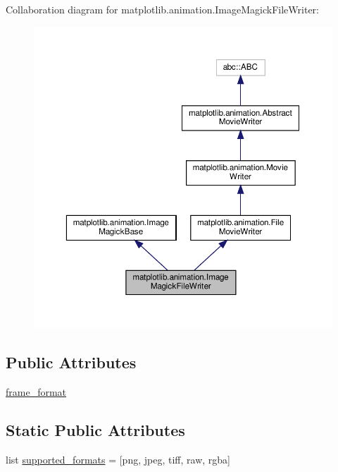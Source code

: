 Collaboration diagram for matplotlib.\+animation.\+Image\+Magick\+File\+Writer\+:
\nopagebreak
\begin{figure}[H]
\begin{center}
\leavevmode
\includegraphics[width=350pt]{classmatplotlib_1_1animation_1_1ImageMagickFileWriter__coll__graph}
\end{center}
\end{figure}
\subsection*{Public Attributes}
\begin{DoxyCompactItemize}
\item 
\hyperlink{classmatplotlib_1_1animation_1_1ImageMagickFileWriter_a3a9df10550b14fb335ca2fdfe79c2781}{frame\+\_\+format}
\end{DoxyCompactItemize}
\subsection*{Static Public Attributes}
\begin{DoxyCompactItemize}
\item 
list \hyperlink{classmatplotlib_1_1animation_1_1ImageMagickFileWriter_ae902db3e2d79b0dee683df573b2b9cb3}{supported\+\_\+formats} = \mbox{[}\textquotesingle{}png\textquotesingle{}, \textquotesingle{}jpeg\textquotesingle{}, \textquotesingle{}tiff\textquotesingle{}, \textquotesingle{}raw\textquotesingle{}, \textquotesingle{}rgba\textquotesingle{}\mbox{]}
\end{DoxyCompactItemize}
